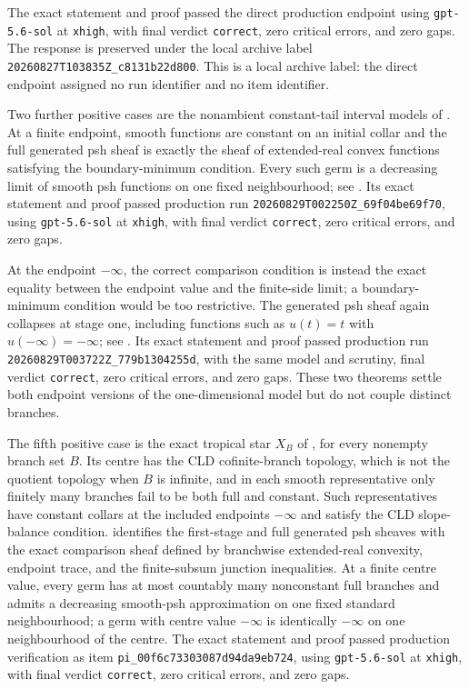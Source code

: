 The exact statement and proof passed the direct production endpoint using
\texttt{gpt-5.6-sol} at \texttt{xhigh}, with final verdict
\texttt{correct}, zero critical errors, and zero gaps.  The response is
preserved under the local archive label
\nolinkurl{20260827T103835Z_c8131b22d800}.  This is a local archive label:
the direct endpoint assigned no run identifier and no item identifier.

Two further positive cases are the nonambient constant-tail interval
models of \cite[Example~6.7.2]{CLD25}.  At a finite endpoint, smooth
functions are constant on an initial collar and the full generated psh sheaf
is exactly the sheaf of extended-real convex functions satisfying the
boundary-minimum condition.  Every such germ is a decreasing limit of smooth
psh functions on one fixed neighbourhood; see
.  Its exact statement and proof
passed production run
\nolinkurl{20260829T002250Z_69f04be69f70}, using
\texttt{gpt-5.6-sol} at \texttt{xhigh}, with final verdict
\texttt{correct}, zero critical errors, and zero gaps.

At the endpoint \(-\infty\), the correct comparison condition is instead the
exact equality between the endpoint value and the finite-side limit; a
boundary-minimum condition would be too restrictive.  The generated psh
sheaf again collapses at stage one, including functions such as \(u(t)=t\)
with \(u(-\infty)=-\infty\); see
.  Its exact statement and proof
passed production run
\nolinkurl{20260829T003722Z_779b1304255d}, with the same model and scrutiny,
final verdict \texttt{correct}, zero critical errors, and zero gaps.  These
two theorems settle both endpoint versions of the one-dimensional model but
do not couple distinct branches.

The fifth positive case is the exact tropical star \(X_B\) of
\cite[\S6.7.3]{CLD25}, for every nonempty branch set \(B\).  Its centre has
the CLD cofinite-branch topology, which is not the quotient topology when
\(B\) is infinite, and in each smooth representative only finitely many
branches fail to be both full and constant.  Such representatives have
constant collars at the included endpoints \(-\infty\) and satisfy the CLD
slope-balance condition.  
identifies the first-stage and full generated psh sheaves with the exact
comparison sheaf defined by branchwise extended-real convexity, endpoint
trace, and the finite-subsum junction inequalities.  At a finite centre
value, every germ has at most countably many nonconstant full branches and
admits a decreasing smooth-psh approximation on one fixed standard
neighbourhood; a germ with centre value \(-\infty\) is identically \(-\infty\)
on one neighbourhood of the centre.  The exact statement and proof passed
production verification as item
\nolinkurl{pi_00f6c73303087d94da9eb724}, using
\texttt{gpt-5.6-sol} at \texttt{xhigh}, with final verdict
\texttt{correct}, zero critical errors, and zero gaps.


